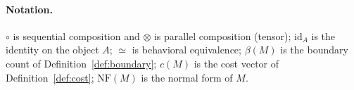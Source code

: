 \paragraph{Notation.}
$\circ$ is sequential composition and $\otimes$ is parallel
composition (tensor); $\mathrm{id}_A$ is the identity on the object
$A$; $\simeq$ is behavioral equivalence; $\beta(M)$ is the boundary
count of Definition~\ref{def:boundary}; $c(M)$ is the cost vector of
Definition~\ref{def:cost}; $\mathrm{NF}(M)$ is the normal form of $M$.
